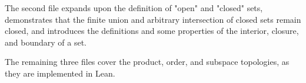 The second file expands upon the definition of "open" and "closed" sets, 
demonstrates that the finite union and arbitrary intersection of closed sets
remain closed, and introduces the definitions and some properties of the 
interior, closure, and boundary of a set.

The remaining three files cover the product, order, and subspace topologies,
as they are implemented in Lean. 